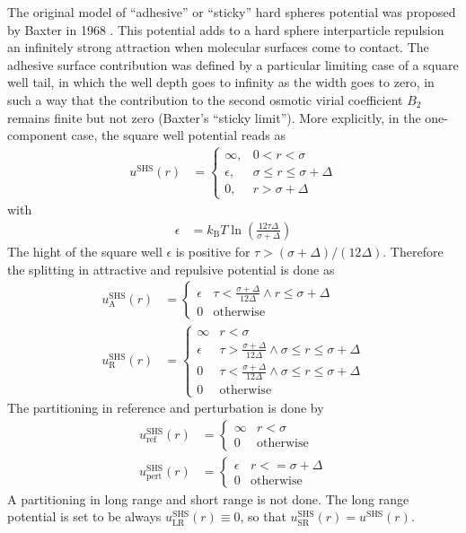The original model of ``adhesive'' or ``sticky'' hard
spheres potential was proposed by Baxter in 1968 \cite{Baxter1968}.
This potential adds to a hard sphere interparticle repulsion an infinitely
strong attraction when molecular surfaces come to contact.
The adhesive surface contribution was defined by a particular
limiting case of a square well tail, in which the well depth goes to
infinity as the width goes to zero, in such a way that the contribution
to the second osmotic virial coefficient $B_2$ remains finite but not
zero (Baxter's ``sticky limit''). More explicitly, in the one-component case,
the square well potential reads as
\begin{align}
u^\text{SHS}(r) &=
\begin{cases}
\infty,   & 0 < r <    \sigma \\
\epsilon, & \sigma \leq r \leq \sigma+\Delta \\
0,        & r > \sigma+\Delta
\end{cases}
\end{align}
with
\begin{align}
\epsilon &= k_\text{B} T \ln\left( \frac{12\tau\Delta}{\sigma+\Delta} \right)
\end{align}
The hight of the square well $\epsilon$ is positive for $\tau>(\sigma+\Delta)/(12\Delta)$.
Therefore the splitting in attractive and repulsive potential is done as
\begin{align}
u^\text{SHS}_\text{A}(r) &=
\begin{cases}
\epsilon & \tau < \frac{\sigma+\Delta}{12\Delta} \wedge r \leq \sigma+\Delta \\
0        & \mbox{otherwise}
\end{cases}
\\
u^\text{SHS}_\text{R}(r) &=
\begin{cases}
\infty & r < \sigma \\
\epsilon  & \tau > \frac{\sigma+\Delta}{12\Delta} \wedge \sigma \leq r \leq \sigma+\Delta \\
0         & \tau < \frac{\sigma+\Delta}{12\Delta} \wedge \sigma \leq r \leq \sigma+\Delta \\
0         & \mbox{otherwise}
\end{cases}
\end{align}
The partitioning in reference and perturbation is done by
\begin{align}
u^\text{SHS}_\text{ref}(r) &=
\begin{cases}
\infty & r < \sigma \\
0        & \mbox{otherwise}
\end{cases}
\\
u^\text{SHS}_\text{pert}(r) &=
\begin{cases}
\epsilon  & r <= \sigma +\Delta\\
0         & \mbox{otherwise}
\end{cases}
\end{align}
A partitioning in long range and short range is not done. The long range potential
is set to be always $u^\text{SHS}_\text{LR}(r) \equiv 0$, so that
$u^\text{SHS}_\text{SR}(r)= u^\text{SHS}(r)$.

